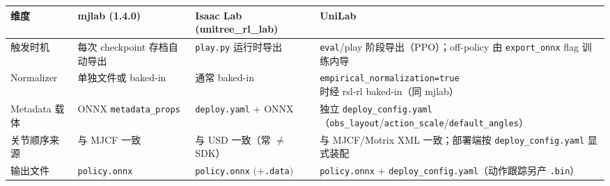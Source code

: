 \begin{center}
\small
\begin{tabular}{@{}lp{3.2cm}p{3.4cm}p{2.4cm}@{}}
\toprule
维度 & mjlab (1.4.0) & Isaac Lab (unitree\_rl\_lab) & UniLab \\
\midrule
触发时机 & 每次 checkpoint 存档自动导出 & \verb|play.py| 运行时导出 & \verb|eval|/play 阶段导出（PPO）；off-policy 由 \verb|export_onnx| flag 训练内导 \\
Normalizer & 单独文件或 baked-in & 通常 baked-in & \verb|empirical_normalization=true| 时经 rsl-rl baked-in（同 mjlab） \\
Metadata 载体 & ONNX \verb|metadata_props| & \verb|deploy.yaml| $+$ ONNX & 独立 \verb|deploy_config.yaml|（\verb|obs_layout|/\verb|action_scale|/\verb|default_angles|） \\
关节顺序来源 & 与 MJCF 一致 & 与 USD 一致（常 $\ne$ SDK） & 与 MJCF/Motrix XML 一致；部署端按 \verb|deploy_config.yaml| 显式装配 \\
输出文件 & \verb|policy.onnx| & \verb|policy.onnx| $(+$\verb|.data|$)$ & \verb|policy.onnx| $+$ \verb|deploy_config.yaml|（动作跟踪另产 \verb|.bin|） \\
\bottomrule
\end{tabular}
\end{center}

